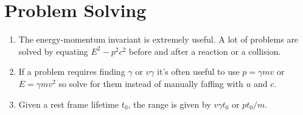 \section{Problem Solving}
\begin{enumerate}
    \item The energy-momentum invariant is extremely useful. A lot of problems are solved by equating $E^2 - p^2c^2$ before and after a reaction or a collision.
    \item If a problem requires finding $\gamma$ or $v \gamma$ it's often useful to use $p = \gamma mv$ or $E = \gamma m v^2$ so solve for them instead of manually faffing with $u$ and $c$.
    \item Given a rest frame lifetime $t_0$, the range is given by $v \gamma t_0$ or $p t_0 / m$.
\end{enumerate}
